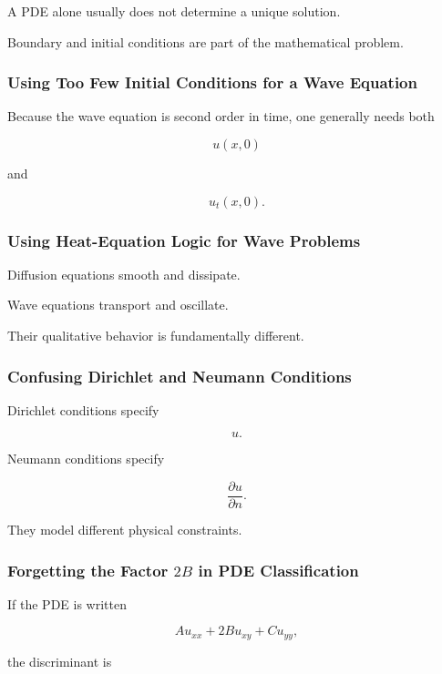 A PDE alone usually does not determine a unique solution.

Boundary and initial conditions are part of the mathematical problem.

\subsubsection{Using Too Few Initial Conditions for a Wave Equation}

Because the wave equation is second order in time, one generally needs
both

\[
u(x,0)
\]

and

\[
u_t(x,0).
\]

\subsubsection{Using Heat-Equation Logic for Wave Problems}

Diffusion equations smooth and dissipate.

Wave equations transport and oscillate.

Their qualitative behavior is fundamentally different.

\subsubsection{Confusing Dirichlet and Neumann Conditions}

Dirichlet conditions specify

\[
\boxed{
u.
}
\]

Neumann conditions specify

\[
\boxed{
\frac{\partial u}{\partial n}.
}
\]

They model different physical constraints.

\subsubsection{Forgetting the Factor \(2B\) in PDE Classification}

If the PDE is written

\[
A u_{xx}
+
2B u_{xy}
+
C u_{yy},
\]

the discriminant is

